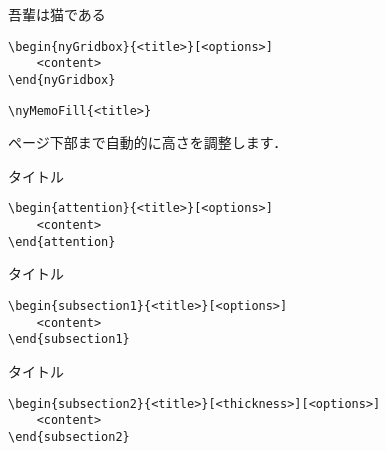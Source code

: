 \documentclass[dvipdfmx,uplatex,b5j,8pt,nomag*]{jsarticle}
\begin{document}
\begin{multicols}{2}
\begin{nyGridbox}{吾輩は猫である}
\end{nyGridbox}
\columnbreak
\begin{lstlisting}
\begin{nyGridbox}{<title>}[<options>]
    <content>
\end{nyGridbox}
\end{lstlisting}
\end{multicols}

\begin{multicols}{2}
\columnbreak
\begin{lstlisting}
\nyMemoFill{<title>}
\end{lstlisting}
ページ下部まで自動的に高さを調整します．
\end{multicols}

\newpage

\begin{multicols}{2}
\begin{attention}{タイトル}
\end{attention}
\columnbreak
\begin{lstlisting}
\begin{attention}{<title>}[<options>]
    <content>
\end{attention}
\end{lstlisting}
\end{multicols}

\begin{multicols}{2}
\begin{subsection1}{タイトル}
\end{subsection1}
\columnbreak
\begin{lstlisting}
\begin{subsection1}{<title>}[<options>]
    <content>
\end{subsection1}
\end{lstlisting}
\end{multicols}

\begin{multicols}{2}
\begin{subsection2}{タイトル}
\end{subsection2}
\columnbreak
\begin{lstlisting}
\begin{subsection2}{<title>}[<thickness>][<options>]
    <content>
\end{subsection2}
\end{lstlisting}
\end{multicols}
\end{document}
